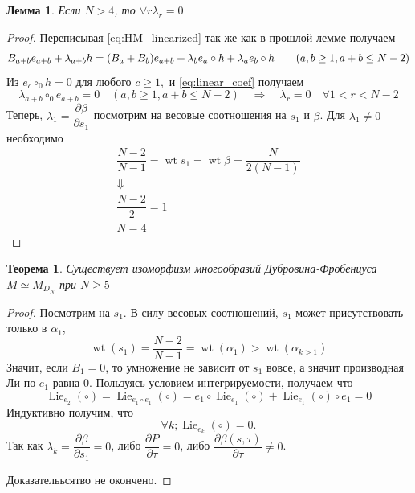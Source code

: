 \documentclass[a4paper, 10pt]{article}
\theoremstyle{plain}
\newtheorem{lem}{Лемма}
\newtheorem{theorem}{Теорема}
\newcommand{\wt}{\operatorname{wt}}
\begin{document}
	\begin{lem}
		Если \(N>4\), то \(\forall r \lambda_r = 0\)
	\end{lem}
	\begin{proof}
		Переписывая \eqref{eq:HM_linearized} так же как в прошлой лемме получаем
		\begin{equation}
			B_{a+b}e_{a+b}+\lambda_{a+b}h = (B_a + B_b)e_{a+b} + \lambda_b e_a \circ h + \lambda_a e_b \circ h \qquad (a,b \ge 1, a+b \le N-2)\\
		\end{equation}
		Из \(e_c\circ_0 h=0 \text{ для любого }c\ge1,\) и \eqref{eq:linear_coef} получаем 
		\[\lambda_{a+b} \circ_0 e_{a+b} = 0 \quad (a,b \ge 1, a+b \le N-2)\quad \Rightarrow \quad \lambda_r = 0 \quad\forall 1<r<N-2  \]
		Теперь, \(\lambda_1 = \dfrac{\partial \beta}{\partial s_1}\) посмотрим на весовые соотношения на \(s_1\) и \(\beta\). Для \(\lambda_1 \neq 0\) необходимо
		\begin{gather*}
				\dfrac{N-2}{N-1} = \wt{s_1} = \wt{\beta} = \dfrac{N}{2(N-1)}\\
				\Downarrow\\
				\dfrac{N-2}{2} = 1\\
				N = 4
		\end{gather*}
	\end{proof}
	\begin{theorem}
		Существует изоморфизм многообразий Дубровина-Фробениуса \(M \simeq M_{D_N}\) при \(N \geq 5\)
	\end{theorem}
	\begin{proof}
		Посмотрим на \(s_1\). В силу весовых соотношений, \(s_1\) может присутствовать только в \(\alpha_1\), 
		\[\operatorname{wt}(s_{1}) = \dfrac{N-2}{N-1} = \operatorname{wt}(\alpha_{1}) > \operatorname{wt}(\alpha_{k>1})\]
		Значит, если \(B_1=0\), то умножение не зависит от \(s_1\) вовсе, а значит производная Ли по \(e_1\) равна 0. Пользуясь условием интегрируемости, получаем что 
		\[\operatorname{Lie}_{e_2}(\circ) = \operatorname{Lie}_{e_1\circ e_1}(\circ) = e_1 \circ \operatorname{Lie}_{e_1}(\circ) + \operatorname{Lie}_{e_1}(\circ) \circ e_1 = 0\]
		Индуктивно получим, что \[\forall k; \operatorname{Lie}_{e_k}(\circ) = 0.\]
		Так как \(\lambda_k = \dfrac{\partial \beta}{\partial s_1} = 0\), либо \(\dfrac{\partial P}{\partial \tau} = 0\), либо \(\dfrac{\partial \beta(s, \tau)}{\partial \tau} \neq 0\).
		\par Доказателььсятво не окончено. 
	\end{proof}
\end{document}
